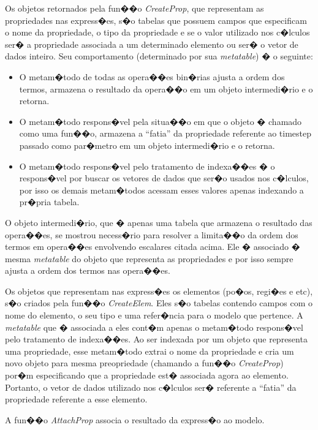 \documentclass[dissertacao,modelo1,brazil]{ThesisPUC}
\begin{document}
Os objetos retornados pela fun��o \emph{CreateProp}, que representam as
propriedades nas express�es, s�o tabelas que possuem campos que
especificam o nome da propriedade, o tipo da propriedade e se o valor utilizado
nos c�lculos ser� a propriedade associada a um determinado elemento ou ser�
o vetor de dados inteiro. Seu comportamento (determinado por sua \emph{metatable})
� o seguinte: 

\begin{itemize}
  \item O metam�todo de todas as opera��es bin�rias ajusta a ordem dos
  termos, armazena o resultado da opera��o em um objeto intermedi�rio
  e o retorna.
  \item O metam�todo respons�vel pela situa��o em que o objeto � chamado 
  como uma fun��o, armazena a ``fatia'' da propriedade referente ao timestep passado como
  par�metro em um objeto intermedi�rio e o retorna.
  \item O metam�todo respons�vel pelo tratamento de indexa��es %
  � o respons�vel por buscar os vetores de dados que ser�o usados nos c�lculos, por 
  isso os demais metam�todos acessam esses valores apenas indexando a pr�pria tabela. 
\end{itemize}

O objeto intermedi�rio, que � apenas uma tabela que armazena o resultado das opera��es,
se mostrou necess�rio para resolver a limita��o da ordem dos termos em opera��es envolvendo
escalares citada acima. Ele � associado � mesma \emph{metatable} do objeto que representa as
propriedades e por isso sempre ajusta a ordem dos termos nas opera��es.

Os objetos que representam nas express�es os elementos (po�os, regi�es e etc), 
s�o criados pela fun��o \emph{CreateElem}. Eles s�o tabelas contendo campos
com o nome do elemento, o seu tipo e uma refer�ncia para o modelo que pertence.
A \emph{metatable} que � associada a eles cont�m apenas o metam�todo respons�vel 
pelo tratamento de indexa��es. Ao ser indexada por um objeto que representa uma propriedade,
esse metam�todo extrai o nome da propriedade e cria um novo objeto para mesma preopriedade
(chamando a fun��o \emph{CreateProp}) por�m especificando que a propriedade est� 
associada agora ao elemento. Portanto, o vetor de dados utilizado nos c�lculos ser�
referente a ``fatia'' da propriedade referente a esse elemento.

A fun��o \emph{AttachProp} associa o resultado da express�o ao modelo. 
\end{document}
